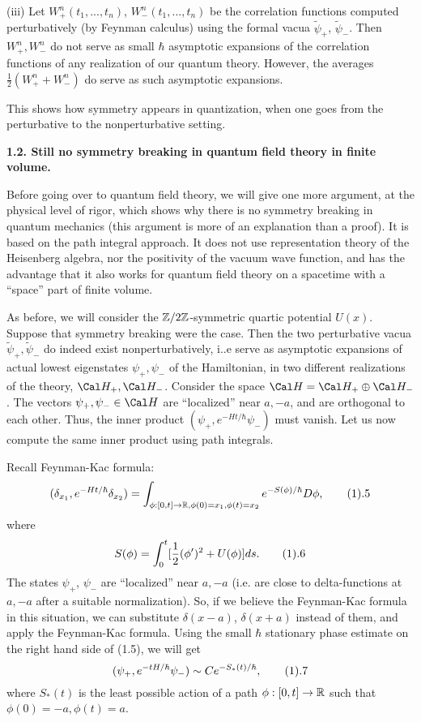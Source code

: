 (iii) Let $W_+^n(t_1,...,t_n)$, 
$W_-^n(t_1,...,t_n)$ be the correlation functions 
computed perturbatively (by Feynman calculus)
using the formal vacua $\tilde\psi_+$,
$\tilde\psi_-$. Then $W_+^n,W_-^n$ do not 
serve as small $\hbar$ asymptotic expansions
of the correlation functions of any realization of our quantum theory. 
However, the averages $\frac{1}{2}(W_+^n+W_-^n)$ do 
serve as such asymptotic expansions. 

This shows how symmetry appears in quantization, when one goes from the 
perturbative to the nonperturbative setting. 

{\bf 1.2. Still no symmetry breaking in quantum field theory
in finite volume.}

Before going over to quantum field theory, we will give one more argument,
at the physical level of rigor, which shows why there is no symmetry 
breaking in quantum mechanics (this argument is more of an explanation 
than a proof). It is based on the path integral 
approach.
It does not use representation theory
of the Heisenberg algebra, nor the positivity of the vacuum wave function,
 and has the advantage that it also works for quantum field
theory on a spacetime with a ``space'' part of finite volume. 

As before, we will consider the $\Bbb Z/2\Bbb Z$-symmetric quartic potential $U(x)$. 
Suppose that symmetry breaking were the case. 
Then the two perturbative vacua $\tilde\psi_+,\tilde\psi_-$ 
do indeed exist nonperturbatively, i..e serve as asymptotic expansions 
of actual lowest eigenstates $\psi_+,\psi_-$ of the Hamiltonian,
in two different realizations of the theory, $\Cal H_+,\Cal H_-$. 
Consider the space $\Cal H=\Cal H_+\oplus\Cal H_-$.  
The vectors $\psi_+,\psi_-\in\Cal H$ are ``localized'' near $a,-a$, and are 
orthogonal to each other. Thus, the inner product 
$(\psi_+, e^{-Ht/\hbar}\psi_-)$ must vanish. 
Let us now compute the same inner product using path integrals. 

Recall Feynman-Kac formula:
$$
(\delta_{x_1},e^{-Ht/\hbar}\delta_{x_2})=
\int_{\phi: [0,t]\to \R, \phi(0)=x_1, \phi(t)=x_2}e^{-S(\phi)/\hbar}D\phi,
\tag 1.5
$$
where 
$$
S(\phi)=\int_{0}^t[\frac{1}{2}(\phi')^2
+U(\phi)]ds.\tag 1.6
$$
The states
 $\psi_+$, $\psi_-$ are ``localized'' near $a,-a$ (i.e. are close 
to delta-functions at $a,-a$ after a suitable normalization).
So, if we believe the Feynman-Kac formula in this situation, we can 
substitute $\delta(x-a)$, $\delta(x+a)$ instead of them, and 
apply the Feynman-Kac formula. Using the small $\hbar$ 
stationary phase estimate 
on the right hand side of (1.5), we will get
$$
(\psi_+, e^{-tH/\hbar}\psi_-)\sim Ce^{-S_*(t)/\hbar},\tag 1.7
$$
where $S_*(t)$ is the least possible action of a path 
$\phi: [0,t]\to \Bbb R$ such that $\phi(0)=-a,\phi(t)=a$. 

